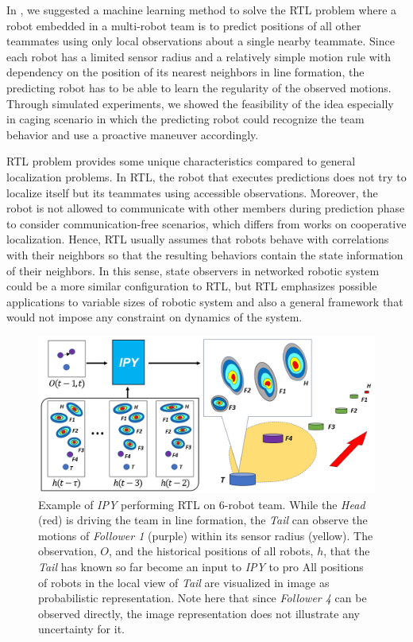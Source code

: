 \documentclass[letterpaper, 10 pt, conference]{ieeeconf}  %
\begin{document}
	In \cite{Choi17}, we suggested a machine learning method to solve the 
	RTL problem where a robot embedded in a multi-robot team is to predict 
	positions of all other teammates using only local observations about a single nearby teammate. 
	Since each robot has a limited sensor radius and a relatively simple motion rule with dependency 
	on the position of its nearest neighbors in line formation, 
	the predicting robot has to be able to learn the regularity 
	of the observed motions. Through simulated experiments, we showed the feasibility of the idea 
	especially in caging scenario in which the predicting robot could recognize the team behavior and 
	use a proactive maneuver accordingly. 
	
	RTL problem provides some unique characteristics compared to general localization problems. 
	In RTL, the robot that executes predictions does not try to localize itself but its teammates using 
	accessible observations. 
	Moreover, the robot is not allowed to communicate with other members during prediction phase to 
	consider communication-free scenarios, which differs from works on cooperative localization. 
	Hence, RTL usually assumes that robots behave with correlations with their neighbors so that 
	the resulting behaviors contain the state information of their neighbors. 	
	In this sense, state observers in networked robotic system could be a more similar 
	configuration to RTL, but RTL emphasizes 
	possible applications to variable sizes of robotic system and also a general framework 
	that would not impose any constraint on dynamics of the system.
	
	\begin{figure}\centering
		\includegraphics[width=1.\columnwidth]{fig_Concept}
		\caption{Example of \emph{IPY} performing RTL on $6$-robot team. 
			While the \emph{Head} (red) is driving 
			the team in line formation, the \emph{Tail} can observe the motions of 
			\emph{Follower 1} (purple) within its sensor radius (yellow).
			The observation, $O$, and the historical positions of all robots, $h$, that
			the \emph{Tail} has known so far become an input to \emph{IPY} to pro 
			All positions of robots in the local view of \emph{Tail} are visualized in 
			image as probabilistic representation. Note here that since \emph{Follower 4} 
			can be observed directly, the image representation does not illustrate any
			uncertainty for it. 
		}
		\label{fig:Concept}
	\end{figure}
	
\end{document}
